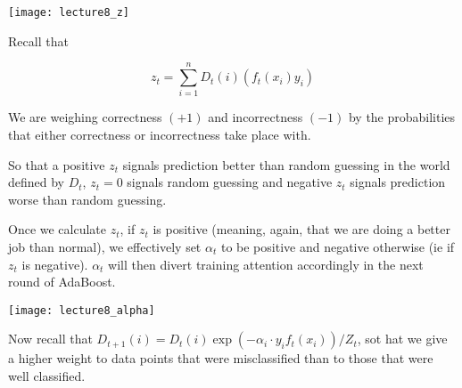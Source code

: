 \documentclass[../main.tex]{subfiles}
\begin{document}
\begin{remark}
        \breathe
    \begin{center}
        \texttt{[image: lecture8\_z]}
    \end{center}

        Recall that 

        \[
            z_t = \sum_{i=1}^{n}D_t(i)(f_t(x_i)y_{i})
        \]

        We are weighing correctness $(+1)$ and incorrectness $(-1)$ by the probabilities
        that either correctness or incorrectness take place with.

        So that a positive $z_t$ signals prediction better than random guessing in the 
        world defined by $D_t$, $z_t = 0$ signals random guessing and negative $z_t$
        signals prediction worse than random guessing.

        Once we calculate $z_t$, if $z_t$ is positive (meaning, again, that we are doing a better
        job than normal), we effectively set $\alpha_t$ to be positive and negative
        otherwise (ie if $z_t$ is negative). $\alpha_t$ will then divert training attention
        accordingly in the next round of AdaBoost.

    \begin{center}
        \texttt{[image: lecture8\_alpha]}
    \end{center}

    Now recall that $D_{t+1}(i) = D_{t}(i) \exp{(-\alpha_i \cdot y_i f_t(x_i))}/Z_{t}$,
    sot hat we give a higher weight to data points that were misclassified than to those
    that were well classified.
    \end{remark}
\end{document}
